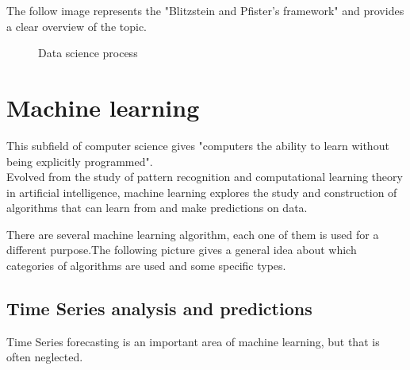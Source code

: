 The follow image represents the "Blitzstein and Pfister's framework" and provides a clear overview of the topic.

\begin{figure}[H]
    \centering
    \caption[Data science process]{Data science process}
    \label{fig: Data_science}
\end{figure}



\newpage


\section{Machine learning}
This subfield of computer science gives "computers the ability to learn without being explicitly programmed". \\Evolved from the study of pattern recognition and computational learning theory in artificial intelligence, machine learning explores the study and construction of algorithms that can learn from and make predictions on data.

There are several machine learning algorithm, each one of them is used for a different purpose.The following picture gives a general idea about which categories of algorithms are used and some specific types.


\subsection{Time Series analysis and predictions}
Time Series forecasting is an important area of machine learning, but that is often neglected.

